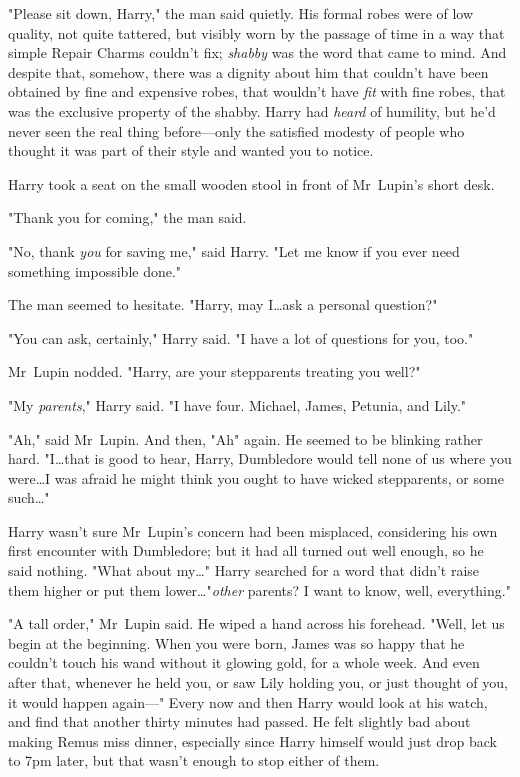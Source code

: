 "Please sit down, Harry," the man said quietly. His formal robes were of low
quality, not quite tattered, but visibly worn by the passage of time in a way
that simple Repair Charms couldn't fix; \emph{shabby} was the word that came to
mind. And despite that, somehow, there was a dignity about him that couldn't
have been obtained by fine and expensive robes, that wouldn't have \emph{fit}
with fine robes, that was the exclusive property of the shabby. Harry had
\emph{heard} of humility, but he'd never seen the real thing before---only the
satisfied modesty of people who thought it was part of their style and wanted
you to notice.

Harry took a seat on the small wooden stool in front of Mr~Lupin's short desk.

"Thank you for coming," the man said.

"No, thank \emph{you} for saving me," said Harry. "Let me know if you ever need
something impossible done."

The man seemed to hesitate. "Harry, may I…ask a personal question?"

"You can ask, certainly," Harry said. "I have a lot of questions for you, too."

Mr~Lupin nodded. "Harry, are your stepparents treating you well?"

"My \emph{parents}," Harry said. "I have four. Michael, James, Petunia, and
Lily."

"Ah," said Mr~Lupin. And then, "Ah" again. He seemed to be blinking rather
hard. "I…that is good to hear, Harry, Dumbledore would tell none of us
where you were…I was afraid he might think you ought to have wicked
stepparents, or some such…"

Harry wasn't sure Mr~Lupin's concern had been misplaced, considering his own
first encounter with Dumbledore; but it had all turned out well enough, so he
said nothing. "What about my…" Harry searched for a word that didn't
raise them higher or put them lower…"\emph{other} parents? I want to
know, well, everything."

"A tall order," Mr~Lupin said. He wiped a hand across his forehead. "Well, let
us begin at the beginning. When you were born, James was so happy that he
couldn't touch his wand without it glowing gold, for a whole week. And even
after that, whenever he held you, or saw Lily holding you, or just thought of
you, it would happen again---"
\later
Every now and then Harry would look at his watch, and find that another thirty
minutes had passed. He felt slightly bad about making Remus miss dinner,
especially since Harry himself would just drop back to 7pm later, but that
wasn't enough to stop either of them.

